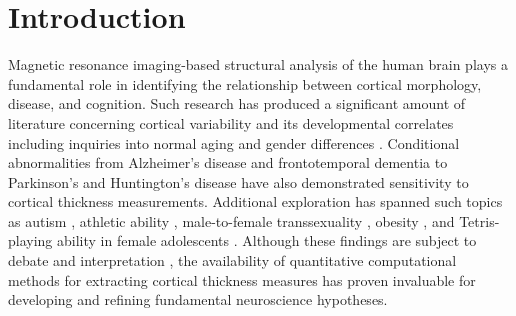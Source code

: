 \section{Introduction}

Magnetic resonance imaging-based 
structural analysis of the human brain plays a fundamental role
in identifying the relationship between cortical morphology, disease, and cognition.
Such research has produced a significant amount of literature concerning
cortical variability and its developmental correlates
including inquiries into normal aging \citep{Walhovd2013} and gender 
differences \citep{luders2006a}.
Conditional abnormalities from Alzheimer's disease and frontotemporal
dementia \citep{du2007,dickerson2009} to Parkinson's \citep{jubault2011}
and Huntington's disease \citep{rosas2005} have also demonstrated sensitivity
to cortical thickness measurements.  Additional exploration has spanned
such topics as autism \citep{chung2005}, athletic
ability \citep{wei2011}, male-to-female transsexuality \citep{luders2012},
obesity \citep{raji2010}, and Tetris-playing ability in female adolescents 
\citep{haier2009}.
Although these findings are subject to debate and interpretation 
\citep{gernsbacher2007}, the availability of quantitative
computational methods for extracting cortical thickness measures
has proven invaluable for developing and refining fundamental 
neuroscience hypotheses.


